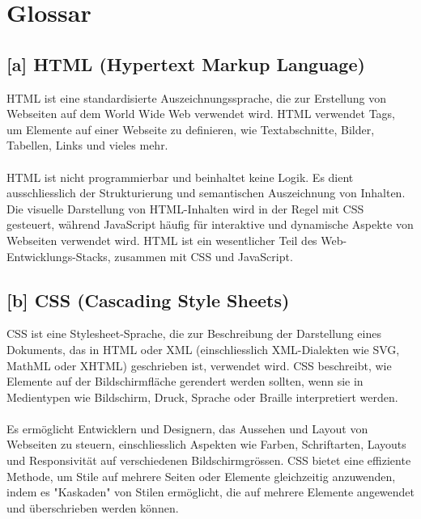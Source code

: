 \section{Glossar}
\subsection*{[a] HTML (Hypertext Markup Language)}
\label{glo:html1}
HTML ist eine standardisierte Auszeichnungssprache, die zur Erstellung von Webseiten auf dem World Wide Web verwendet wird. HTML verwendet Tags, um Elemente auf einer Webseite zu definieren, wie Textabschnitte, Bilder, Tabellen, Links und vieles mehr. \\\\
HTML ist nicht programmierbar und beinhaltet keine Logik. Es dient ausschliesslich der Strukturierung und semantischen Auszeichnung von Inhalten. Die visuelle Darstellung von HTML-Inhalten wird in der Regel mit CSS gesteuert, während JavaScript häufig für interaktive und dynamische Aspekte von Webseiten verwendet wird. HTML ist ein wesentlicher Teil des Web-Entwicklungs-Stacks, zusammen mit CSS und JavaScript.
\subsection*{[b] CSS (Cascading Style Sheets)}
\label{glo:css}
CSS ist eine Stylesheet-Sprache, die zur Beschreibung der Darstellung eines Dokuments, das in HTML oder XML (einschliesslich XML-Dialekten wie SVG, MathML oder XHTML) geschrieben ist, verwendet wird. CSS beschreibt, wie Elemente auf der Bildschirmfläche gerendert werden sollten, wenn sie in Medientypen wie Bildschirm, Druck, Sprache oder Braille interpretiert werden.\\\\
Es ermöglicht Entwicklern und Designern, das Aussehen und Layout von Webseiten zu steuern, einschliesslich Aspekten wie Farben, Schriftarten, Layouts und Responsivität auf verschiedenen Bildschirmgrössen. CSS bietet eine effiziente Methode, um Stile auf mehrere Seiten oder Elemente gleichzeitig anzuwenden, indem es "Kaskaden" von Stilen ermöglicht, die auf mehrere Elemente angewendet und überschrieben werden können.
